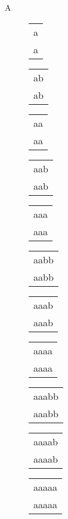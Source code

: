 \begin{description}
\item[A] 
\begin{tabular}{|l|} \hline
a \\
a \\
\hline
\end{tabular} 
\begin{tabular}{|l|} \hline
ab \\
ab \\
\hline
\end{tabular} 
\begin{tabular}{|l|} \hline
aa \\
aa \\
\hline
\end{tabular} 
\begin{tabular}{|l|} \hline
aab \\
aab \\
\hline
\end{tabular} 
\begin{tabular}{|l|} \hline
aaa \\
aaa \\
\hline
\end{tabular} 
\begin{tabular}{|l|} \hline
aabb \\
aabb \\
\hline
\end{tabular} 
\begin{tabular}{|l|} \hline
aaab \\
aaab \\
\hline
\end{tabular} 
\begin{tabular}{|l|} \hline
aaaa \\
aaaa \\
\hline
\end{tabular} 
\begin{tabular}{|l|} \hline
aaabb \\
aaabb \\
\hline
\end{tabular} 
\begin{tabular}{|l|} \hline
aaaab \\
aaaab \\
\hline
\end{tabular} 
\begin{tabular}{|l|} \hline
aaaaa \\
aaaaa \\
\hline
\end{tabular} 
\begin{tabular}{|l|} \hline

\end{tabular}
\end{description}
